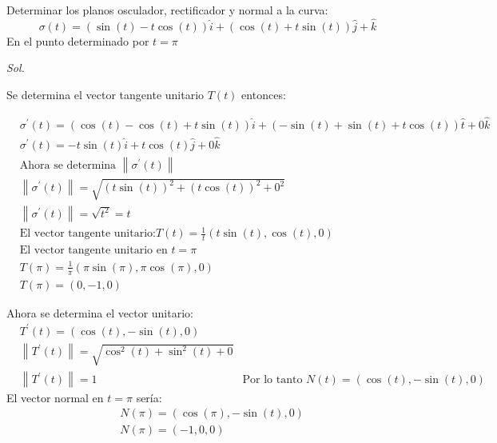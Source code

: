 Determinar los planos osculador, rectificador y normal a la curva:
\begin{equation*}
	\sigma(t)=\left(\sin{(t)}-t\cos{(t)}\right)\hat{i}+\left(\cos{(t)}+t\sin{(t)}\right)\hat{j}+\hat{k}
\end{equation*}
En el punto determinado por $t=\pi$

\textit{ Sol. }

Se determina el vector tangente unitario $T(t)$ entonces:

\begin{align*}
	 & \sigma^{\prime}(t)=\left(\cos{(t)}-\cos{(t)}+t\sin{(t)}\right)\hat{i}+\left(-\sin{(t)}+\sin{(t)}+t\cos{(t)}\right)\hat{t}+0\hat{k} \\
	 & \sigma^{\prime}(t)=-t\sin{(t)}\hat{i}+t\cos{(t)}\hat{j}+0\hat{k}                                                                   \\
	 & \text{Ahora se determina } \left\lVert \sigma^{\prime}(t)\right\rVert                                                              \\
	 & \left\lVert \sigma^{\prime}(t)\right\rVert=\sqrt{\left(t\sin{(t)}\right)^2+\left(t\cos{(t)}\right)^2+0^2}                          \\
	 & \left\lVert \sigma^{\prime}(t)\right\rVert=\sqrt{t^2}=t                                                                            \\
	 & \text{El vector tangente unitario:}T(t)=\frac{1}{t}\left(t\sin{(t)},\cos{(t)},0\right)                                             \\
	 & \text{El vector tangente unitario en }t=\pi                                                                                        \\
	 & T(\pi)=\frac{1}{\pi}\left(\pi\sin{(\pi)},\pi\cos{(\pi)},0\right)                                                                   \\
	 & T(\pi)=(0,-1,0)
\end{align*}

Ahora se determina el vector unitario:
\begin{align*}
	 & T^{\prime}(t)=\left(\cos{(t)},-\sin{(t)},0\right)                  \\
	 & \left\lVert T^{\prime}(t)\right\rVert=\sqrt{\cos^2(t)+\sin^2(t)+0} \\
	 & \left\lVert T^{\prime}(t)\right\rVert=1
	 & \text{Por lo tanto }N(t)=\left(\cos{(t)},-\sin{(t)},0\right)
\end{align*}
El vector normal en $t=\pi$ sería:
\begin{align*}
	 & N(\pi)=\left(\cos{(\pi)},-\sin{(t)},0\right) \\
	 & N(\pi)=(-1,0,0)
\end{align*}

